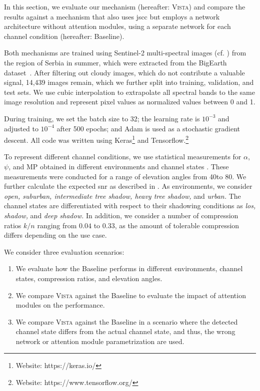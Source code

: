 \documentclass[conference]{IEEEtran}
\newcommand\MP{\ensuremath{\mathrm{MP}}\xspace}
\newcommand\ours{\textsc{Vista}\xspace}
\newcommand\baseline{Baseline\xspace}
\newcommand\sentinelii{Sentinel-2\xspace}
\begin{document}
In this section, we evaluate our mechanism (hereafter: \ours) and compare the results against a mechanism that also uses \ac{jscc} but employs a network architecture without attention modules, using a separate network for each channel condition (hereafter: \baseline).

Both mechanisms are trained using \sentinelii multi-spectral images (cf. ) from the region of Serbia in summer, which were extracted from the BigEarth dataset~\cite{sumbul2019bigearthnet,Sumbul2021}.
After filtering out cloudy images, which do not contribute a valuable signal, 14,439 images remain, which we further split into training, validation, and test sets.
We use cubic interpolation to extrapolate all spectral bands to the same image resolution and represent pixel values as normalized values between 0 and 1.

During training, we set the batch size to 32; the learning rate is $10^{-3}$ and adjusted to $10^{-4}$ after 500 epochs; and Adam is used as a stochastic gradient descent.
All code was written using Keras\footnote{Website: https://keras.io/} and Tensorflow.\footnote{Website: https://www.tensorflow.org/}

To represent different channel conditions, we use statistical measurements for $\alpha$, $\psi$, and \MP obtained in different environments and channel states \cite{channel-params}.
These measurements were conducted for a range of elevation angles from 40\textdegree to 80\textdegree.
We further calculate the expected \ac{snr} as described in .
As environments, we consider \emph{open, suburban, intermediate tree shadow, heavy tree shadow,} and \emph{urban.}
The channel states are differentiated with respect to their shadowing conditions as \emph{\acf{los}, shadow,} and \emph{deep shadow.}
In addition, we consider a number of compression ratios $k/n$ ranging from $0.04$ to $0.33$, as the amount of tolerable compression differs depending on the use case.

We consider three evaluation scenarios:
%
\begin{enumerate}
  \item We evaluate how the \baseline performs in different environments, channel states, compression ratios, and elevation angles.
  \item We compare \ours against the \baseline to evaluate the impact of attention modules on the performance.
  \item We compare \ours against the \baseline in a scenario where the detected channel state differs from the actual channel state, and thus, the wrong network or attention module parametrization are used.
\end{enumerate}
\end{document}

